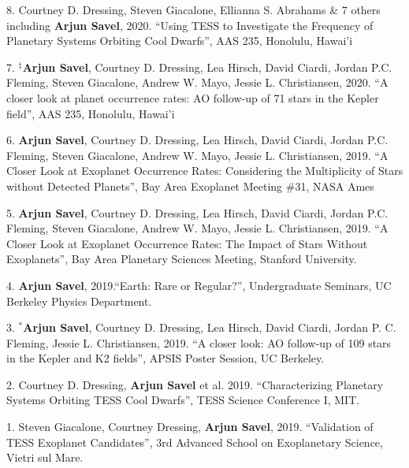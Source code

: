 \documentclass[12pt,letterpaper]{article}
\begin{document}
\begin{list}{}{\cvlist}

\item 8. Courtney D. Dressing, Steven Giacalone, Ellianna S. Abrahams \& 7 others including \textbf{Arjun Savel}, 2020. ``Using TESS to Investigate the Frequency of Planetary Systems Orbiting Cool Dwarfs'', AAS 235, Honolulu, Hawai'i

\item 7. $^\ddagger$\textbf{Arjun Savel}, Courtney D. Dressing, Lea Hirsch, David Ciardi, Jordan P.C. Fleming, Steven Giacalone, Andrew W. Mayo, Jessie L. Christiansen, 2020. “A closer look at planet occurrence rates: AO follow-up of 71 stars in the Kepler field”, AAS 235, Honolulu, Hawai'i

\item 6. \textbf{Arjun Savel}, Courtney D. Dressing, Lea Hirsch, David Ciardi, Jordan P.C. Fleming, Steven Giacalone, Andrew W. Mayo, Jessie L. Christiansen, 2019. “A Closer Look at Exoplanet Occurrence Rates: Considering the Multiplicity of Stars without Detected Planets”, Bay Area Exoplanet Meeting \#31, NASA Ames

\item 5. \textbf{Arjun Savel}, Courtney D. Dressing, Lea Hirsch, David Ciardi, Jordan P.C. Fleming, Steven Giacalone, Andrew W. Mayo, Jessie L. Christiansen, 2019. “A Closer Look at Exoplanet Occurrence Rates: The Impact of Stars Without Exoplanets”, Bay Area Planetary Sciences Meeting, Stanford University.

\item 4. \textbf{Arjun Savel}, 2019.“Earth: Rare or Regular?”, Undergraduate Seminars, UC Berkeley Physics Department.

\item 3. $^*$\textbf{Arjun Savel}, Courtney D. Dressing, Lea Hirsch, David Ciardi, Jordan P. C. Fleming, Jessie L. Christiansen, 2019. “A closer look: AO follow-up of 109 stars in the Kepler and K2 fields”, APSIS Poster Session, UC Berkeley.

\item 2. Courtney D. Dressing, \textbf{Arjun Savel} et al. 2019. “Characterizing Planetary Systems Orbiting TESS Cool Dwarfs”, TESS Science Conference I, MIT.

\item 1. Steven Giacalone, Courtney Dressing, \textbf{Arjun Savel}, 2019. “Validation of TESS Exoplanet Candidates”, 3rd Advanced School on Exoplanetary Science, Vietri sul Mare.

\end{list}
\end{document}
